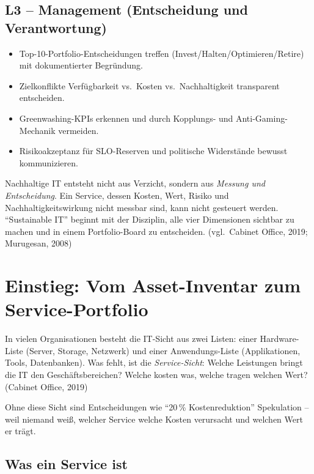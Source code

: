\documentclass[11pt,a4paper,oneside]{article}
\newcommand{\quelle}[1]{{\footnotesize\color{lpGray}(#1)}}
\begin{document}
\subsection*{L3 -- Management (Entscheidung und Verantwortung)}
\begin{itemize}
  \item Top-10-Portfolio-Entscheidungen treffen (Invest/Halten/Optimieren/Retire) mit dokumentierter Begründung.
  \item Zielkonflikte Verfügbarkeit vs.\ Kosten vs.\ Nachhaltigkeit transparent entscheiden.
  \item Greenwashing-KPIs erkennen und durch Kopplungs- und Anti-Gaming-Mechanik vermeiden.
  \item Risikoakzeptanz für SLO-Reserven und politische Widerstände bewusst kommunizieren.
\end{itemize}

\begin{merkbox}
Nachhaltige IT entsteht nicht aus Verzicht, sondern aus \emph{Messung und Entscheidung}. Ein Service, dessen Kosten, Wert, Risiko und Nachhaltigkeitswirkung nicht messbar sind, kann nicht gesteuert werden. ``Sustainable IT'' beginnt mit der Disziplin, alle vier Dimensionen sichtbar zu machen und in einem Portfolio-Board zu entscheiden. \quelle{vgl.\ Cabinet Office, 2019; Murugesan, 2008}
\end{merkbox}

\clearpage

\section{Einstieg: Vom Asset-Inventar zum Service-Portfolio}

In vielen Organisationen besteht die IT-Sicht aus zwei Listen: einer Hardware-Liste (Server, Storage, Netzwerk) und einer Anwendungs-Liste (Applikationen, Tools, Datenbanken). Was fehlt, ist die \emph{Service-Sicht}: Welche Leistungen bringt die IT den Geschäftsbereichen? Welche kosten was, welche tragen welchen Wert? \quelle{Cabinet Office, 2019}

Ohne diese Sicht sind Entscheidungen wie ``20\,\% Kostenreduktion'' Spekulation -- weil niemand weiß, welcher Service welche Kosten verursacht und welchen Wert er trägt.

\subsection{Was ein Service ist}
\end{document}
